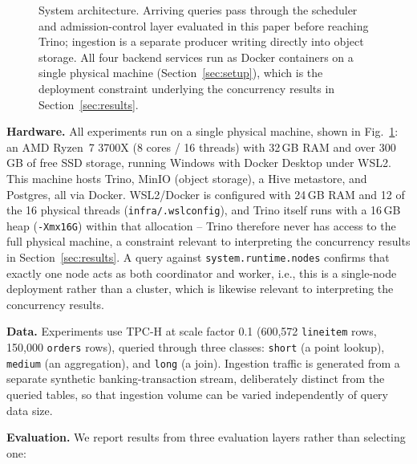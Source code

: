\documentclass[conference]{IEEEtran}
\begin{document}
\begin{figure}[t]
{\begin{tikzpicture}
\end{tikzpicture}%
}
\caption{System architecture. Arriving queries pass through the scheduler and admission-control layer evaluated in this paper before reaching Trino; ingestion is a separate producer writing directly into object storage. All four backend services run as Docker containers on a single physical machine (Section~\ref{sec:setup}), which is the deployment constraint underlying the concurrency results in Section~\ref{sec:results}.}
\label{fig:architecture}
\end{figure}

\textbf{Hardware.} All experiments run on a single physical machine, shown in Fig.~\ref{fig:architecture}: an AMD Ryzen~7 3700X (8 cores / 16 threads) with 32\,GB RAM and over 300\,GB of free SSD storage, running Windows with Docker Desktop under WSL2. This machine hosts Trino, MinIO (object storage), a Hive metastore, and Postgres, all via Docker. WSL2/Docker is configured with 24\,GB RAM and 12 of the 16 physical threads (\texttt{infra/.wslconfig}), and Trino itself runs with a 16\,GB heap (\texttt{-Xmx16G}) within that allocation -- Trino therefore never has access to the full physical machine, a constraint relevant to interpreting the concurrency results in Section~\ref{sec:results}. A query against \texttt{system.runtime.nodes} confirms that exactly one node acts as both coordinator and worker, i.e., this is a single-node deployment rather than a cluster, which is likewise relevant to interpreting the concurrency results.

\textbf{Data.} Experiments use TPC-H at scale factor 0.1 (600{,}572 \texttt{lineitem} rows, 150{,}000 \texttt{orders} rows), queried through three classes: \texttt{short} (a point lookup), \texttt{medium} (an aggregation), and \texttt{long} (a join). Ingestion traffic is generated from a separate synthetic banking-transaction stream, deliberately distinct from the queried tables, so that ingestion volume can be varied independently of query data size.

\textbf{Evaluation.} We report results from three evaluation layers rather than selecting one:
\end{document}
